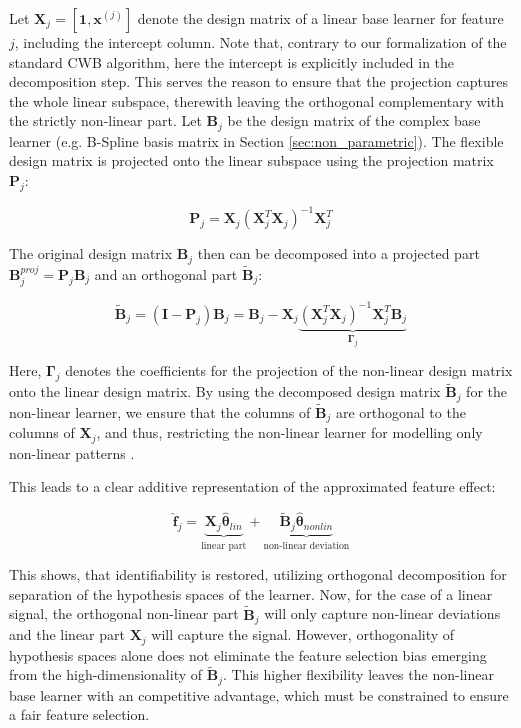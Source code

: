 \documentclass[fontsize=12 pt]{scrartcl}
\begin{document}
Let $\mathbf{X}_j = [\mathbf{1}, \mathbf{x}^{(j)}]$ denote the design matrix of a linear base learner for feature $j$, including the intercept column. Note that, contrary to our formalization of the standard CWB algorithm, here the intercept is explicitly included in the decomposition step. This serves the reason to ensure that the projection captures the whole linear subspace, therewith leaving the orthogonal complementary with the strictly non-linear part. Let $\mathbf{B}_j$ be the design matrix of the complex base learner (e.g. B-Spline basis matrix in Section \ref{sec:non_parametric}). The flexible design matrix is projected onto the linear subspace using the projection matrix $\mathbf{P}_j$:

\begin{equation}
    \mathbf{P}_j = \mathbf{X}_j (\mathbf{X}_j^T \mathbf{X}_j)^{-1} \mathbf{X}_j^T
\end{equation}

The original design matrix $\mathbf{B}_j$ then can be decomposed into a projected part $\mathbf{B}_j^{proj} = \mathbf{P}_j \mathbf{B}_j$ and an orthogonal part $\tilde{\mathbf{B}}_j$:

\begin{equation}
    \tilde{\mathbf{B}}_j = (\mathbf{I} - \mathbf{P}_j) \mathbf{B}_j = \mathbf{B}_j - \mathbf{X}_j \underbrace{(\mathbf{X}_j^T \mathbf{X}_j)^{-1} \mathbf{X}_j^T \mathbf{B}_j}_{\boldsymbol{\Gamma}_j}
\end{equation}

Here, $\boldsymbol{\Gamma}_j$ denotes the coefficients for the projection of the non-linear design matrix onto the linear design matrix. By using the decomposed design matrix $\tilde{\mathbf{B}}_j$ for the non-linear learner, we ensure that the columns of $\tilde{\mathbf{B}}_j$ are orthogonal to the columns of $\mathbf{X}_j$, and thus, restricting the non-linear learner for modelling only non-linear patterns \citep{schmid2008boosting}.

This leads to a clear additive representation of the approximated feature effect:

\begin{equation}
    \hat{\mathbf{f}}_j = \underbrace{\mathbf{X}_j \hat{\boldsymbol{\theta}}_{lin}}_{\text{linear part}} + \underbrace{\tilde{\mathbf{B}}_j \hat{\boldsymbol{\theta}}_{nonlin}}_{\text{non-linear deviation}}
\end{equation}

This shows, that identifiability is restored, utilizing orthogonal decomposition for separation of the hypothesis spaces of the learner. Now, for the case of a linear signal, the orthogonal non-linear part $\tilde{\mathbf{B}}_j$ will only capture non-linear deviations and the linear part $\mathbf{X}_j$ will capture the signal. However, orthogonality of hypothesis spaces alone does not eliminate the feature selection bias emerging from the high-dimensionality of $\tilde{\mathbf{B}}_j$. This higher flexibility leaves the non-linear base learner with an competitive advantage, which must be constrained to ensure a fair feature selection. 
\end{document}
